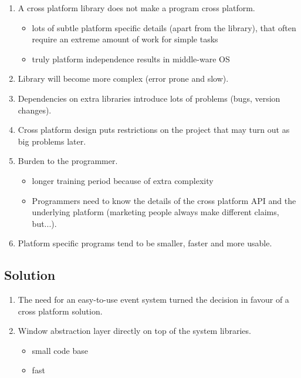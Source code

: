 \documentclass[12pt,a4paper]{article}
\begin{document}
\begin{enumerate}
\item
  A cross platform library does not make a program cross platform.

  \begin{itemize}
  \item
    lots of subtle platform specific details (apart from the library),
    that often require an extreme amount of work for simple tasks
  \item
    truly platform independence results in middle-ware OS
  \end{itemize}
\item
  Library will become more complex (error prone and slow).
\item
  Dependencies on extra libraries introduce lots of problems (bugs,
  version changes).
\item
  Cross platform design puts restrictions on the project that may
  turn out as big problems later.
\item
  Burden to the programmer.

  \begin{itemize}
  \item
    longer training period because of extra complexity
  \item
    Programmers need to know the details of the cross platform API and
    the underlying platform (marketing people always make different
    claims, but...).
  \end{itemize}
\item
  Platform specific programs tend to be smaller, faster and more usable.
\end{enumerate}

\subsection{Solution}

\begin{enumerate}
\item
  The need for an easy-to-use event system turned the decision in favour
  of a cross platform solution.
\item
  Window abstraction layer directly on top of the system libraries.
  \begin{itemize}
  \item
    small code base
  \item
    fast
  \end{itemize}
\end{enumerate}
\end{document}
